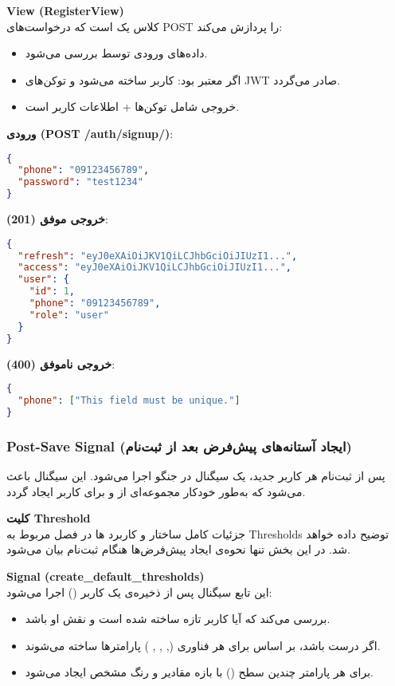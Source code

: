 \documentclass{report}
\begin{document}
\textbf{View (RegisterView)} \\
کلاس  یک  است که درخواست‌های POST را پردازش می‌کند:
\begin{itemize}
  \item داده‌های ورودی توسط  بررسی می‌شود.
  \item اگر معتبر بود: کاربر ساخته می‌شود و توکن‌های JWT صادر می‌گردد.
  \item خروجی شامل توکن‌ها + اطلاعات کاربر است.
\end{itemize}

\textbf{ورودی (POST /auth/signup/)}:
\begin{lstlisting}[language=json]
{
  "phone": "09123456789",
  "password": "test1234"
}
\end{lstlisting}

\textbf{خروجی موفق (201)}:
\begin{lstlisting}[language=json]
{
  "refresh": "eyJ0eXAiOiJKV1QiLCJhbGciOiJIUzI1...",
  "access": "eyJ0eXAiOiJKV1QiLCJhbGciOiJIUzI1...",
  "user": {
    "id": 1,
    "phone": "09123456789",
    "role": "user"
  }
}
\end{lstlisting}

\textbf{خروجی ناموفق (400)}:
\begin{lstlisting}[language=json]
{
  "phone": ["This field must be unique."]
}
\end{lstlisting}
\subsubsection{Post-Save Signal (ایجاد آستانه‌های پیش‌فرض بعد از ثبت‌نام)}

پس از ثبت‌نام هر کاربر جدید، یک سیگنال  در جنگو اجرا می‌شود. این سیگنال باعث می‌شود که به‌طور خودکار مجموعه‌ای از  و  برای کاربر ایجاد گردد.

\textbf{کلیت Threshold} \\
جزئیات کامل ساختار و کاربرد ها در فصل مربوط به Thresholds توضیح داده خواهد شد. 
در این بخش تنها نحوه‌ی ایجاد پیش‌فرض‌ها هنگام ثبت‌نام بیان می‌شود.

\textbf{Signal (create\_default\_thresholds)} \\
این تابع سیگنال پس از ذخیره‌ی یک کاربر () اجرا می‌شود:
\begin{itemize}
  \item بررسی می‌کند که آیا کاربر تازه ساخته شده است و نقش او  باشد.
  \item اگر درست باشد، بر اساس  برای هر فناوری (, , , ) پارامترها ساخته می‌شوند.
  \item برای هر پارامتر چندین سطح () با بازه مقادیر و رنگ مشخص ایجاد می‌شود.
\end{itemize}
\end{document}
